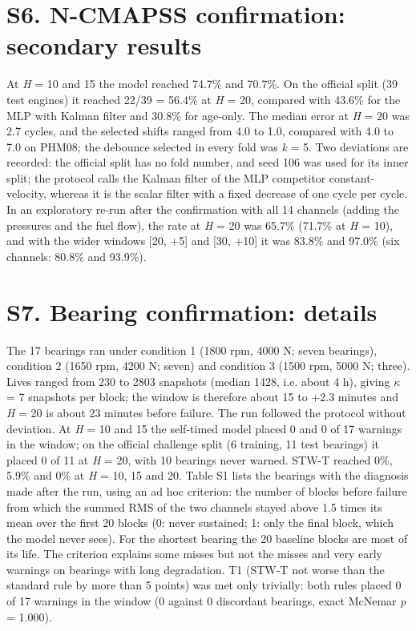 \documentclass[11pt,a4paper]{article}
\begin{document}
\section*{S6. N-CMAPSS confirmation: secondary results}

\noindent At \textit{H} = 10 and 15 the model reached 74.7\% and 70.7\%. On the official split (39 test engines) it reached 22/39 = 56.4\% at \textit{H} = 20, compared with 43.6\% for the MLP with Kalman filter and 30.8\% for age-only. The median error at \textit{H} = 20 was \textminus{}2.7 cycles, and the selected shifts ranged from \textminus{}4.0 to \textminus{}1.0, compared with \textminus{}4.0 to \textminus{}7.0 on PHM08; the debounce selected in every fold was \textit{k} = 5. Two deviations are recorded: the official split has no fold number, and seed 106 was used for its inner split; the protocol calls the Kalman filter of the MLP competitor constant-velocity, whereas it is the scalar filter with a fixed decrease of one cycle per cycle. In an exploratory re-run after the confirmation with all 14 channels (adding the pressures and the fuel flow), the rate at \textit{H} = 20 was 65.7\% (71.7\% at \textit{H} = 10), and with the wider windows [\textminus{}20, +5] and [\textminus{}30, +10] it was 83.8\% and 97.0\% (six channels: 80.8\% and 93.9\%).

\section*{S7. Bearing confirmation: details}

\noindent The 17 bearings ran under condition 1 (1800 rpm, 4000 N; seven bearings), condition 2 (1650 rpm, 4200 N; seven) and condition 3 (1500 rpm, 5000 N; three). Lives ranged from 230 to 2803 snapshots (median 1428, i.e. about 4 h), giving $\kappa$ = 7 snapshots per block; the window is therefore about \textminus{}15 to +2.3 minutes and \textit{H} = 20 is about 23 minutes before failure. The run followed the protocol without deviation. At \textit{H} = 10 and 15 the self-timed model placed 0 and 0 of 17 warnings in the window; on the official challenge split (6 training, 11 test bearings) it placed 0 of 11 at \textit{H} = 20, with 10 bearings never warned. STW-T reached 0\%, 5.9\% and 0\% at \textit{H} = 10, 15 and 20. Table S1 lists the bearings with the diagnosis made after the run, using an ad hoc criterion: the number of blocks before failure from which the summed RMS of the two channels stayed above 1.5 times its mean over the first 20 blocks (0: never sustained; 1: only the final block, which the model never sees). For the shortest bearing the 20 baseline blocks are most of its life. The criterion explains some misses but not the misses and very early warnings on bearings with long degradation. T1 (STW-T not worse than the standard rule by more than 5 points) was met only trivially: both rules placed 0 of 17 warnings in the window (0 against 0 discordant bearings, exact McNemar \textit{p} = 1.000).
\end{document}
